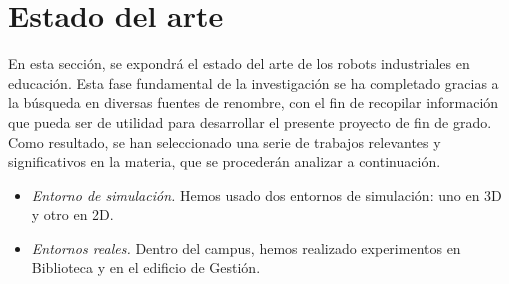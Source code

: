 \chapter{Estado del arte}
\label{cap:capitulo2}
En esta sección, se expondrá el estado del arte de los robots industriales en educación. Esta fase fundamental de la 
investigación se ha completado gracias a la búsqueda en diversas fuentes de renombre, con el fin de 
recopilar información que pueda ser de utilidad para desarrollar el presente proyecto de fin de grado. Como resultado, se 
han seleccionado una serie de trabajos relevantes y significativos en la materia, que se procederán analizar a continuación.
\begin{itemize}
    \item \textit{Entorno de simulación.} Hemos usado dos entornos de simulación: uno en 3D y otro en 2D.
    \item \textit{Entornos reales.} Dentro del campus, hemos realizado experimentos en Biblioteca y en el edificio de Gestión.
   \end{itemize}\
\vspace{1cm}
